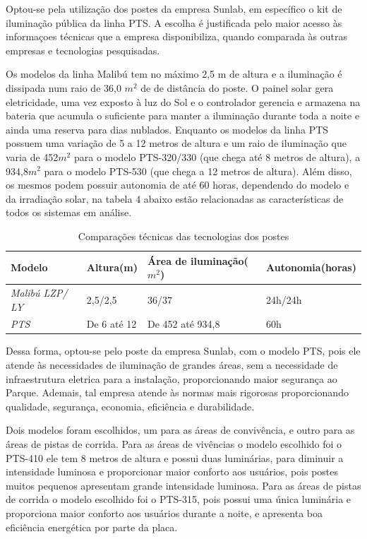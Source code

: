 	Optou-se pela utilização dos postes da empresa Sunlab, em específico o kit de iluminação pública da linha PTS. A escolha é justificada pelo maior acesso às informaçoes técnicas que a empresa disponibiliza, quando comparada às outras empresas e tecnologias pesquisadas.
	
	Os modelos da linha Malibú tem  no máximo 2,5 m de altura e a iluminação é dissipada num raio de 36,0 $m^{2}$ de de distância do poste. O painel solar gera eletricidade, uma vez exposto à luz do Sol e o controlador gerencia e armazena na bateria que acumula o suficiente para manter a iluminação durante toda a noite e ainda uma reserva para dias nublados. Enquanto os modelos da linha PTS possuem uma variação de 5 a 12 metros de altura e um raio de iluminação que varia de 452$m^{2}$ para o modelo PTS-320/330 (que chega até 8 metros de altura), a  934,8$m^{2}$ para o modelo PTS-530 (que chega a 12 metros de altura). Além disso, os mesmos podem possuir autonomia de até 60 horas, dependendo do modelo e da irradiação solar, na tabela 4 abaixo estão relacionadas as características de todos os sistemas em análise.

\begin{table}[h]
\caption{Comparações técnicas das tecnologias dos postes}
\begin{tabular}{llll}
\hline
\multicolumn{1}{|l|}{\textbf{Modelo}} & \multicolumn{1}{l|}{\textbf{Altura(m)}} & \multicolumn{1}{l|}{\textbf{Área de iluminação($m^{2}$)}} & \multicolumn{1}{l|}{\textbf{Autonomia(horas)}} \\ \hline
\multicolumn{1}{|l|}{\textit{Malibú LZP/ LY}} & \multicolumn{1}{l|}{2,5/2,5} & \multicolumn{1}{l|}{36/37} & \multicolumn{1}{l|}{24h/24h} \\ \hline
\multicolumn{1}{|l|}{\textit{PTS}} & \multicolumn{1}{l|}{De 6 até 12} & \multicolumn{1}{l|}{De 452 até 934,8} & \multicolumn{1}{l|}{60h} \\ \hline
\end{tabular}
\end{table}

	Dessa forma, optou-se pelo poste da empresa Sunlab, com o modelo PTS, pois ele atende às necessidades de iluminação de grandes áreas, sem a necessidade de infraestrutura eletrica para a instalação, proporcionando maior segurança ao Parque. Ademais, tal empresa atende às normas mais rigorosas proporcionando qualidade, segurança, economia, eficiência e durabilidade.
 
	Dois modelos foram escolhidos, um para as áreas de convivência, e outro para as áreas de pistas de corrida. Para as áreas de vivências o modelo escolhido foi o PTS-410 ele tem 8 metros de altura e possui duas luminárias, para diminuir a intensidade luminosa e proporcionar maior conforto aos usuários, pois postes muitos pequenos apresentam grande intensidade luminosa. Para as áreas de pistas de corrida o modelo escolhido foi o PTS-315, pois possui uma única luminária e proporciona maior conforto aos usuários durante a noite, e apresenta boa eficiência energética por parte da placa.

